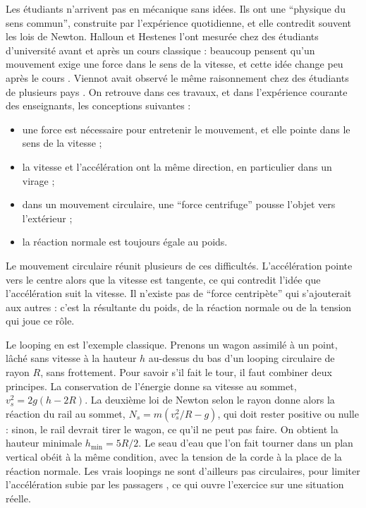 Les étudiants n'arrivent pas en mécanique sans idées. Ils ont une
\enquote{physique du sens commun}, construite par l'expérience quotidienne,
et elle contredit souvent les lois de Newton. Halloun et Hestenes l'ont
mesurée chez des étudiants d'université avant et après un cours classique :
beaucoup pensent qu'un mouvement exige une force dans le sens de la vitesse,
et cette idée change peu après le cours \cite{halloun1985common}. Viennot
avait observé le même raisonnement chez des étudiants de plusieurs pays
\cite{viennot1979}. On retrouve dans ces travaux, et dans l'expérience
courante des enseignants, les conceptions suivantes :
\begin{itemize}
  \item une force est nécessaire pour entretenir le mouvement, et elle pointe
        dans le sens de la vitesse ;
  \item la vitesse et l'accélération ont la même direction, en particulier
        dans un virage ;
  \item dans un mouvement circulaire, une \enquote{force centrifuge} pousse
        l'objet vers l'extérieur ;
  \item la réaction normale est toujours égale au poids.
\end{itemize}

Le mouvement circulaire réunit plusieurs de ces difficultés. L'accélération
pointe vers le centre alors que la vitesse est tangente, ce qui contredit
l'idée que l'accélération suit la vitesse. Il n'existe pas de \enquote{force
centripète} qui s'ajouterait aux autres : c'est la résultante du poids, de la
réaction normale ou de la tension qui joue ce rôle.

Le looping en est l'exemple classique. Prenons un wagon assimilé à un point,
lâché sans vitesse à la hauteur \(h\) au-dessus du bas d'un looping
circulaire de rayon \(R\), sans frottement. Pour savoir s'il fait le tour, il
faut combiner deux principes. La conservation de l'énergie donne sa vitesse
au sommet, \(v_s^2 = 2 g (h - 2R)\). La deuxième loi de Newton selon le rayon
donne alors la réaction du rail au sommet, \(N_s = m (v_s^2/R - g)\), qui doit
rester positive ou nulle : sinon, le rail devrait tirer le wagon, ce qu'il ne
peut pas faire. On obtient la hauteur minimale \(h_{\min} = 5R/2\). Le seau
d'eau que l'on fait tourner dans un plan vertical obéit à la même condition,
avec la tension de la corde à la place de la réaction normale. Les vrais
loopings ne sont d'ailleurs pas circulaires, pour limiter l'accélération
subie par les passagers \cite{pendrill2005loops}, ce qui ouvre l'exercice sur
une situation réelle.

